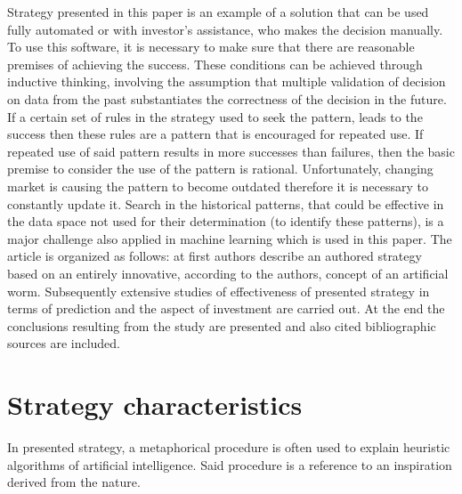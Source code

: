\documentclass[runningheads,a4paper]{llncs}
\begin{document}
Strategy presented in this paper is an example of a solution that can be used fully automated or with investor’s assistance, who makes the decision manually. To use this software, it is necessary to make sure that there are reasonable premises of achieving the success. These conditions can be achieved through inductive thinking, involving the assumption that multiple validation of decision on data from the past substantiates the correctness of the decision in the future. If a certain set of rules in the strategy used to seek the pattern, leads to the success then these rules are a pattern that is encouraged for repeated use. If repeated use of said pattern results in more successes than failures, then the basic premise to consider the use of the pattern is rational\cite{bishop2006pattern}. Unfortunately, changing market is causing the pattern to become outdated therefore it is necessary to constantly update it. Search in the historical patterns, that could be effective in the data space not used for their determination (to identify these patterns), is a major challenge also applied in machine learning which is used in this paper.
The article is organized as follows: at first authors describe an authored strategy based on an entirely innovative, according to the authors, concept of an artificial worm. Subsequently extensive studies of effectiveness of presented strategy in terms of prediction and the aspect of investment are carried out. At the end the conclusions resulting from the study are presented and also cited bibliographic sources are included.

\section{Strategy characteristics}
In presented strategy, a metaphorical procedure is often used to explain heuristic algorithms of artificial intelligence. Said procedure is a reference to an inspiration derived from the nature.\\
\end{document}
